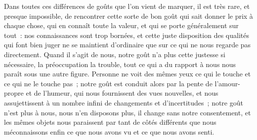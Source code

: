 \documentclass[french,twoside]{book} %
\begin{document}
Dans toutes ces différences de goûts que l’on vient de marquer, il est très rare, et presque impossible, de rencontrer cette sorte de bon goût qui sait donner le prix à chaque chose, qui en connaît toute la valeur, et qui se porte généralement sur tout : nos connaissances sont trop bornées, et cette juste disposition des qualités qui font bien juger ne se maintient d’ordinaire que sur ce qui ne nous regarde pas directement. Quand il s’agit de nous, notre goût n’a plus cette justesse si nécessaire, la préoccupation la trouble, tout ce qui a du rapport à nous nous paraît sous une autre figure. Personne ne voit des mêmes yeux ce qui le touche et ce qui ne le touche pas ; notre goût est conduit alors par la pente de l’amour-propre et de l’humeur, qui nous fournissent des vues nouvelles, et nous assujettissent à un nombre infini de changements et d’incertitudes ; notre goût n’est plus à nous, nous n’en disposons plus, il change sans notre consentement, et les mêmes objets nous paraissent par tant de côtés différents que nous méconnaissons enfin ce que nous avons vu et ce que nous avons senti.
\end{document}
